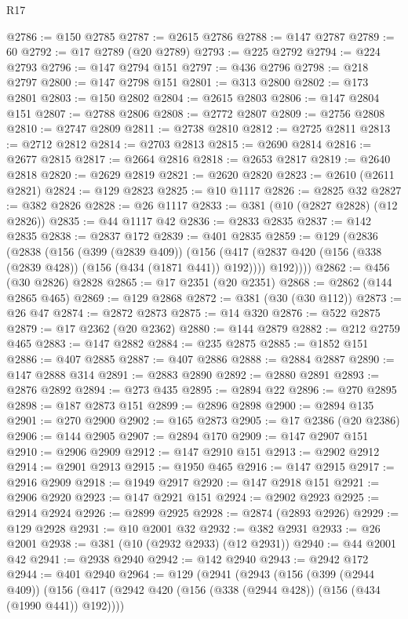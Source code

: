 \begin{lexlean}{R17}
\begin{coremodule}
@2786 := @150 @2785
@2787 := @2615 @2786
@2788 := @147 @2787
@2789 := 60
@2792 := @17 @2789 (@20 @2789)
@2793 := @225 @2792
@2794 := @224 @2793
@2796 := @147 @2794 @151
@2797 := @436 @2796
@2798 := @218 @2797
@2800 := @147 @2798 @151
@2801 := @313 @2800
@2802 := @173 @2801
@2803 := @150 @2802
@2804 := @2615 @2803
@2806 := @147 @2804 @151
@2807 := @2788 @2806
@2808 := @2772 @2807
@2809 := @2756 @2808
@2810 := @2747 @2809
@2811 := @2738 @2810
@2812 := @2725 @2811
@2813 := @2712 @2812
@2814 := @2703 @2813
@2815 := @2690 @2814
@2816 := @2677 @2815
@2817 := @2664 @2816
@2818 := @2653 @2817
@2819 := @2640 @2818
@2820 := @2629 @2819
@2821 := @2620 @2820
@2823 := @2610 (@2611 @2821)
@2824 := @129 @2823
@2825 := @10 @1117
@2826 := @2825 @32
@2827 := @382 @2826
@2828 := @26 @1117
@2833 := @381 (@10 (@2827 @2828) (@12 @2826))
@2835 := @44 @1117 @42
@2836 := @2833 @2835
@2837 := @142 @2835
@2838 := @2837 @172
@2839 := @401 @2835
@2859 := @129
    (@2836
      (@2838
        (@156
          (@399 (@2839 @409))
          (@156
            (@417 (@2837 @420 (@156 (@338 (@2839 @428)) (@156 (@434 (@1871 @441)) @192))))
            @192))))
@2862 := @456 (@30 @2826) @2828
@2865 := @17 @2351 (@20 @2351)
@2868 := @2862 (@144 @2865 @465)
@2869 := @129 @2868
@2872 := @381 (@30 (@30 @112))
@2873 := @26 @47
@2874 := @2872 @2873
@2875 := @14 @320
@2876 := @522 @2875
@2879 := @17 @2362 (@20 @2362)
@2880 := @144 @2879
@2882 := @212 @2759 @465
@2883 := @147 @2882
@2884 := @235 @2875
@2885 := @1852 @151
@2886 := @407 @2885
@2887 := @407 @2886
@2888 := @2884 @2887
@2890 := @147 @2888 @314
@2891 := @2883 @2890
@2892 := @2880 @2891
@2893 := @2876 @2892
@2894 := @273 @435
@2895 := @2894 @22
@2896 := @270 @2895
@2898 := @187 @2873 @151
@2899 := @2896 @2898
@2900 := @2894 @135
@2901 := @270 @2900
@2902 := @165 @2873
@2905 := @17 @2386 (@20 @2386)
@2906 := @144 @2905
@2907 := @2894 @170
@2909 := @147 @2907 @151
@2910 := @2906 @2909
@2912 := @147 @2910 @151
@2913 := @2902 @2912
@2914 := @2901 @2913
@2915 := @1950 @465
@2916 := @147 @2915
@2917 := @2916 @2909
@2918 := @1949 @2917
@2920 := @147 @2918 @151
@2921 := @2906 @2920
@2923 := @147 @2921 @151
@2924 := @2902 @2923
@2925 := @2914 @2924
@2926 := @2899 @2925
@2928 := @2874 (@2893 @2926)
@2929 := @129 @2928
@2931 := @10 @2001 @32
@2932 := @382 @2931
@2933 := @26 @2001
@2938 := @381 (@10 (@2932 @2933) (@12 @2931))
@2940 := @44 @2001 @42
@2941 := @2938 @2940
@2942 := @142 @2940
@2943 := @2942 @172
@2944 := @401 @2940
@2964 := @129
    (@2941
      (@2943
        (@156
          (@399 (@2944 @409))
          (@156
            (@417 (@2942 @420 (@156 (@338 (@2944 @428)) (@156 (@434 (@1990 @441)) @192))))

\end{coremodule}
\end{lexlean}
